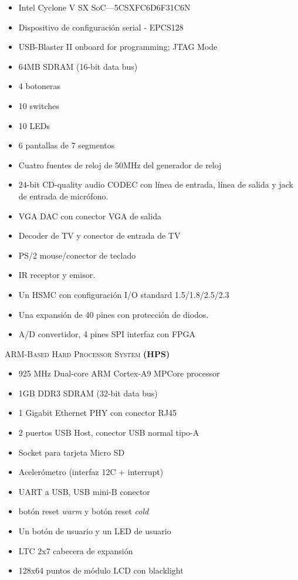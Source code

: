 \documentclass[conference]{IEEEtran}
\begin{document}
\begin{itemize}
	\item Intel Cyclone V SX SoC—5CSXFC6D6F31C6N
	\item Dispositivo de configuración serial - EPCS128
	\item USB-Blaster II onboard for programming; JTAG Mode
	\item 64MB SDRAM (16-bit data bus)
	\item 4 botoneras
	\item 10 switches
	\item 10 LEDs
	\item 6 pantallas de 7 segmentos
	\item Cuatro fuentes de reloj de 50MHz del generador de reloj
	\item 24-bit CD-quality audio CODEC con línea de entrada, línea de salida y jack de entrada de micrófono.
	\item VGA DAC con conector VGA de salida
	\item Decoder de TV y conector de entrada de TV
	\item PS/2 mouse/conector de teclado
	\item IR receptor y emisor.
	\item Un HSMC con configuración I/O standard 1.5/1.8/2.5/2.3
	\item Una expansión de 40 pines con protección de diodos.
	\item A/D convertidor, 4 pines SPI interfaz con FPGA
\end{itemize}\vspace{2mm}
\textsc{ARM-Based Hard Processor System\textbf{ (HPS)} }
\begin{itemize}
	\item 925 MHz Dual-core ARM Cortex-A9 MPCore processor
	\item 1GB DDR3 SDRAM (32-bit data bus)
	\item 1 Gigabit Ethernet PHY con conector RJ45
	\item 2 puertos USB Host, conector USB normal tipo-A
	\item Socket para tarjeta Micro SD
	\item Acelerómetro (interfaz 12C + interrupt)
	\item UART a USB, USB mini-B conector
	\item botón reset \textit{warm} y botón reset \textit{cold}
	\item Un botón de usuario y un LED de usuario
	\item LTC 2x7 cabecera de expansión
	\item 128x64 puntos de módulo LCD con blacklight
\end{itemize}
\end{document}
